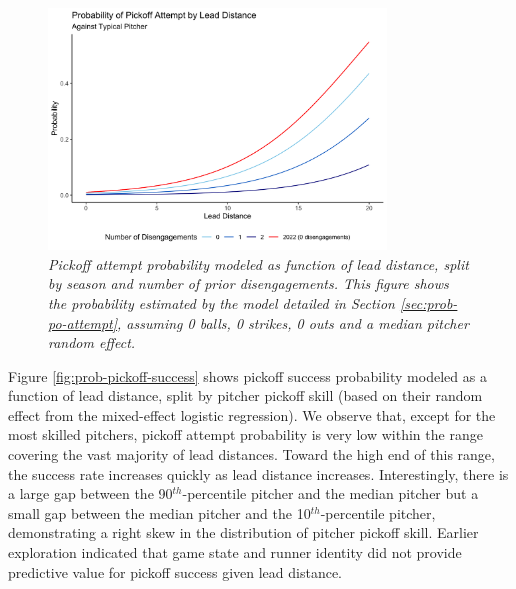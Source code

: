 \documentclass{article}
\begin{document}
      \begin{figure}
        \centering
        \includegraphics[width = 0.8\textwidth]{figures/prob_pickoff_attempt.png}
        \caption{
          \it Pickoff attempt probability modeled as function of lead distance, split by season and number of prior disengagements. This figure shows the probability estimated by the model detailed in Section \ref{sec:prob-po-attempt}, assuming 0 balls, 0 strikes, 0 outs and a median pitcher random effect.
        }
        \label{fig:prob-pickoff-attempt}
      \end{figure}
      
      Figure \ref{fig:prob-pickoff-success} shows pickoff success probability modeled as a function of lead distance, split by pitcher pickoff skill (based on their random effect from the mixed-effect logistic regression). We observe that, except for the most skilled pitchers, pickoff attempt probability is very low within the range covering the vast majority of lead distances. Toward the high end of this range, the success rate increases quickly as lead distance increases. Interestingly, there is a large gap between the 90$^{th}$-percentile pitcher and the median pitcher but a small gap between the median pitcher and the 10$^{th}$-percentile pitcher, demonstrating a right skew in the distribution of pitcher pickoff skill. Earlier exploration indicated that game state and runner identity did not provide predictive value for pickoff success given lead distance.
  
\end{document}
